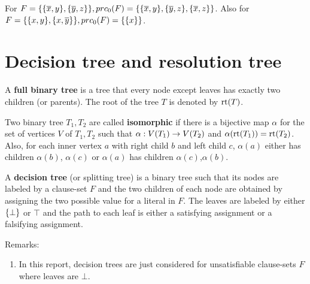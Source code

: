 \documentclass{report}
\begin{document}
\begin{examp}\label{exp:bbb}
For $F = \{\{ \overline x, y\} , \{ \overline y, z\}\}, prc_0(F) = \{\{\overline x, y\} , \{\overline y, z\} , \{\overline x, z\}\}$. Also for $F = \{ \{ x, y \} , \{ x,\overline y \} \}, prc_0(F) = \{ \{ x \} \}$.
\end{examp}
\section{Decision tree and resolution tree}
\label{sec:trees}

A \textbf{full binary tree} is a tree that every node except leaves has exactly two children (or parents). The root of the tree $T$ is denoted by $\operatorname{rt}(T)$.

\begin{defi}\label{def:isomo-trees}
Two binary tree $T_1, T_2$ are called \textbf{isomorphic} if there is a bijective map $\alpha$ for the set of vertices $V$ of $T_1, T_2$ such that $\alpha: V(T_1) \rightarrow V(T_2)$ and $\alpha(\operatorname{rt}(T_1))=\operatorname{rt}(T_2)$. Also, for each inner vertex $a$ with right child $b$ and left child $c$, $\alpha(a)$ either has children $\alpha(b)$, $\alpha(c)$ or $\alpha(a)$ has children $\alpha(c)$,$\alpha(b)$.
\end{defi}

\begin{defi}\label{def:decs-tree}
A \textbf{decision tree} (or splitting tree) is a binary tree such that its nodes are labeled by a clause-set $F$ and the two children of each node are obtained by assigning the two possible value for a literal in $F$. The leaves are labeled by either $\{ \bot \}$ or $\top$ and the path to each leaf is either a satisfying assignment or a falsifying assignment.
\end{defi}
Remarks:
  \begin{enumerate}
  \item  In this report, decision trees are just considered for unsatisfiable clause-sets $F$ where leaves are $\bot$.
  \end{enumerate}
\end{document}
